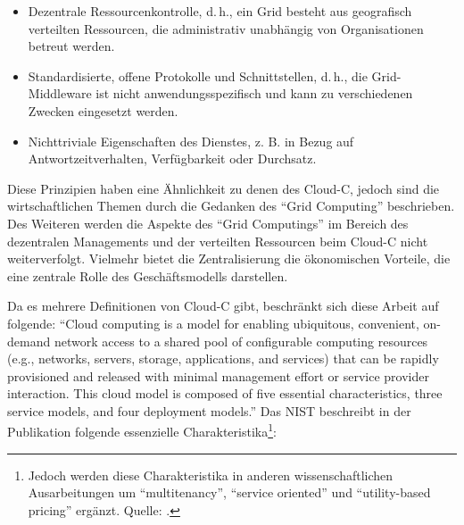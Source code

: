 \begin{itemize}
	\item Dezentrale Ressourcenkontrolle, d.\,h., ein Grid besteht aus geografisch verteilten Ressourcen, die administrativ unabhängig von Organisationen betreut werden.	
	\item Standardisierte, offene Protokolle und Schnittstellen, d.\,h., die Grid-Middleware
	ist nicht anwendungsspezifisch und kann zu verschiedenen Zwecken eingesetzt
	werden.
	\item Nichttriviale Eigenschaften des Dienstes, z. B. in Bezug auf Antwortzeitverhalten, Verfügbarkeit oder Durchsatz.
\end{itemize}
Diese Prinzipien haben eine Ähnlichkeit zu denen des \ac{Cloud-C}, jedoch sind die wirtschaftlichen Themen durch die Gedanken des \enquote{Grid Computing} beschrieben. Des Weiteren werden die Aspekte des \enquote{Grid Computings} im Bereich des dezentralen Managements und der verteilten Ressourcen beim \ac{Cloud-C} nicht weiterverfolgt. Vielmehr bietet die Zentralisierung die ökonomischen Vorteile, die eine zentrale Rolle des Geschäftsmodells darstellen. \par
Da es mehrere Definitionen von \ac{Cloud-C} gibt, beschränkt sich diese Arbeit auf folgende: \enquote{Cloud computing is a model for enabling ubiquitous, convenient, on-demand network access to a shared pool of configurable computing resources (e.g., networks, servers, storage, applications, and services) that can be rapidly provisioned and released with minimal management effort or service provider interaction. This cloud model is composed of five essential characteristics, three service models, and four deployment models.}\autocite[][S.\,2]{mell_nist_2011} Das \ac{NIST} beschreibt in der Publikation \cite{mell_nist_2011} folgende essenzielle Charakteristika\footnote{Jedoch werden diese Charakteristika in anderen wissenschaftlichen Ausarbeitungen um \enquote{multitenancy}, \enquote{service oriented} und \enquote{utility-based pricing} ergänzt. Quelle: \cite[vgl.][S.\,1]{institute_of_electrical_and_electronics_engineers_cloud_2011}.}: 

